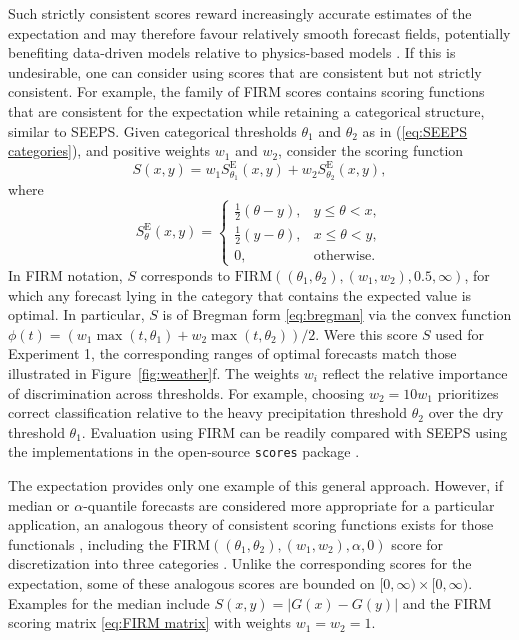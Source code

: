\documentclass[10pt]{article} %
\theoremstyle{theorem}
\theoremstyle{definition}
\begin{document}
Such strictly consistent scores reward increasingly accurate estimates of the expectation and may therefore favour relatively smooth forecast fields, potentially benefiting data-driven models relative to physics-based models \citep{pan2025comparative, sha2025investigating}. If this is undesirable, one can consider using scores that are consistent but not strictly consistent. For example, the family of FIRM scores \citep{taggart2022scoring} contains scoring functions that are consistent for the expectation while retaining a categorical structure, similar to SEEPS. Given categorical thresholds $\theta_1$ and $\theta_2$ as in (\ref{eq:SEEPS categories}), and positive weights $w_1$ and $w_2$, consider the scoring function
\begin{equation}\label{eq:FIRM expectation}
S(x,y) = w_1 S^\mathrm{E}_{\theta_1}(x,y) + w_2 S^\mathrm{E}_{\theta_2}(x,y),
\end{equation}
where
\[
 S^\mathrm{E}_\theta(x,y)=
\begin{cases}
\tfrac12 (\theta-y), & y\leq \theta < x, \\
\tfrac12 (y-\theta), & x\leq \theta < y, \\
0, & \text{otherwise}.
\end{cases}
\]
In FIRM notation, $S$ corresponds to $\mathrm{FIRM}((\theta_1,\theta_2),(w_1,w_2),0.5,\infty)$, for which any forecast lying in the category that contains the expected value is optimal. In particular, $S$ is of Bregman form \eqref{eq:bregman} via the convex function $\phi(t) = (w_1\max(t,\theta_1)+w_2\max(t,\theta_2))/2$. Were this score $S$ used for Experiment 1, the corresponding ranges of optimal forecasts match those illustrated in Figure~\ref{fig:weather}f. The weights $w_i$ reflect the relative importance of discrimination across thresholds. For example, choosing $w_2=10w_1$ prioritizes correct classification relative to the heavy precipitation threshold $\theta_2$ over the dry threshold $\theta_1$. Evaluation using FIRM can be readily compared with SEEPS using the implementations in the open-source \texttt{scores} package \citep{leeuwenburg2024scores}.

The expectation provides only one example of this general approach. However, if median or $\alpha$-quantile forecasts are considered more appropriate for a particular application, an analogous theory of consistent scoring functions exists for those functionals \citep[Theorem~3.2]{gneiting2011quantiles}, including the $\mathrm{FIRM}((\theta_1,\theta_2),(w_1,w_2),\alpha,0)$ score for discretization into three categories \citep{taggart2022scoring}.  Unlike the corresponding scores for the expectation, some of these analogous scores are bounded on $[0,\infty)\times[0,\infty)$. Examples for the median include $S(x,y)=|G(x)-G(y)|$ and the FIRM scoring matrix \eqref{eq:FIRM matrix} with weights $w_1=w_2=1$.
\end{document}
